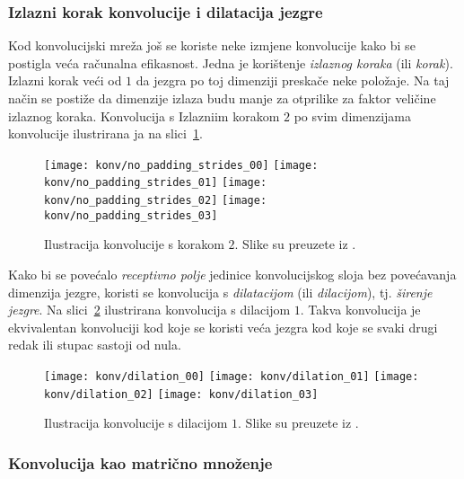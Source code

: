 \documentclass[utf8, diplomski, lmodern]{fer}
\begin{document}
\subsubsection{Izlazni korak konvolucije i dilatacija jezgre}

Kod konvolucijski mreža još se koriste neke izmjene konvolucije kako bi se postigla veća računalna efikasnost. Jedna je korištenje \emph{izlaznog koraka} (ili \emph{korak}). Izlazni korak veći od $1$ da jezgra po toj dimenziji preskače neke položaje. Na taj način se postiže da dimenzije izlaza budu manje za otprilike za faktor veličine izlaznog koraka. Konvolucija s Izlazniim korakom $2$ po svim dimenzijama konvolucije ilustrirana ja na slici~\ref{fig:konvolucija-izl-korak}. 

\begin{figure}
	\centering
	\texttt{[image: konv/no\_padding\_strides\_00]}
	\texttt{[image: konv/no\_padding\_strides\_01]}
	\texttt{[image: konv/no\_padding\_strides\_02]}
	\texttt{[image: konv/no\_padding\_strides\_03]}
	\caption{Ilustracija konvolucije s korakom $2$. Slike su preuzete iz \citet{Dumoulin:2016:GCADL}.}
	\label{fig:konvolucija-izl-korak}
\end{figure}

Kako bi se povećalo \emph{receptivno polje} jedinice konvolucijskog sloja bez povećavanja dimenzija jezgre, koristi se konvolucija s \emph{dilatacijom} (ili \emph{dilacijom}), tj. \emph{širenje jezgre}. Na slici~\ref{fig:konvolucija-dilatacija} ilustrirana konvolucija s dilacijom $1$. Takva konvolucija je ekvivalentan konvoluciji kod koje se koristi veća jezgra kod koje se svaki drugi redak ili stupac sastoji od nula.

\begin{figure}
	\centering
	\texttt{[image: konv/dilation\_00]}
	\texttt{[image: konv/dilation\_01]}
	\texttt{[image: konv/dilation\_02]}
	\texttt{[image: konv/dilation\_03]}
	\caption{Ilustracija konvolucije s dilacijom $1$. Slike su preuzete iz \citet{Dumoulin:2016:GCADL}.}
	\label{fig:konvolucija-dilatacija}
\end{figure}

\subsubsection{Konvolucija kao matrično množenje}
\end{document}
